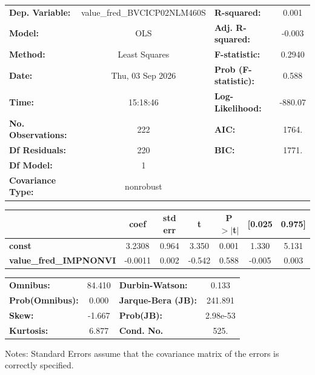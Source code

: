 \begin{center}
\begin{tabular}{lclc}
\toprule
\textbf{Dep. Variable:}        & value\_fred\_BVCICP02NLM460S & \textbf{  R-squared:         } &     0.001   \\
\textbf{Model:}                &             OLS              & \textbf{  Adj. R-squared:    } &    -0.003   \\
\textbf{Method:}               &        Least Squares         & \textbf{  F-statistic:       } &    0.2940   \\
\textbf{Date:}                 &       Thu, 03 Sep 2026       & \textbf{  Prob (F-statistic):} &    0.588    \\
\textbf{Time:}                 &           15:18:46           & \textbf{  Log-Likelihood:    } &   -880.07   \\
\textbf{No. Observations:}     &               222            & \textbf{  AIC:               } &     1764.   \\
\textbf{Df Residuals:}         &               220            & \textbf{  BIC:               } &     1771.   \\
\textbf{Df Model:}             &                 1            & \textbf{                     } &             \\
\textbf{Covariance Type:}      &          nonrobust           & \textbf{                     } &             \\
\bottomrule
\end{tabular}
\begin{tabular}{lcccccc}
                               & \textbf{coef} & \textbf{std err} & \textbf{t} & \textbf{P$> |$t$|$} & \textbf{[0.025} & \textbf{0.975]}  \\
\midrule
\textbf{const}                 &       3.2308  &        0.964     &     3.350  &         0.001        &        1.330    &        5.131     \\
\textbf{value\_fred\_IMPNONVI} &      -0.0011  &        0.002     &    -0.542  &         0.588        &       -0.005    &        0.003     \\
\bottomrule
\end{tabular}
\begin{tabular}{lclc}
\textbf{Omnibus:}       & 84.410 & \textbf{  Durbin-Watson:     } &    0.133  \\
\textbf{Prob(Omnibus):} &  0.000 & \textbf{  Jarque-Bera (JB):  } &  241.891  \\
\textbf{Skew:}          & -1.667 & \textbf{  Prob(JB):          } & 2.98e-53  \\
\textbf{Kurtosis:}      &  6.877 & \textbf{  Cond. No.          } &     525.  \\
\bottomrule
\end{tabular}
\end{center}

Notes: \newline
 [1] Standard Errors assume that the covariance matrix of the errors is correctly specified.